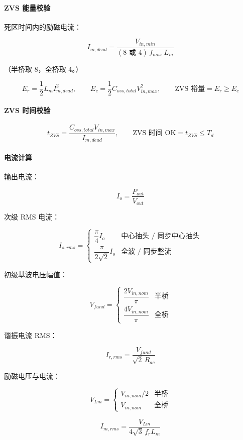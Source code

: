 \documentclass[UTF8]{ctexart}
\begin{document}
\paragraph{ZVS 能量校验}

死区时间内的励磁电流：

\[
I_{m,dead} = \frac{V_{in,min}}{(8\text{ 或 }4)\,f_{max}\,L_m}
\]

（半桥取 8，全桥取 4。）

\[
E_r = \frac{1}{2} L_m I_{m,dead}^{2},\qquad
E_c = \frac{1}{2} C_{oss,total} V_{in,max}^{2},\qquad
\text{ZVS 裕量} = E_r \ge E_c
\]

\paragraph{ZVS 时间校验}

\[
t_{ZVS} = \frac{C_{oss,total} V_{in,max}}{I_{m,dead}},\qquad
\text{ZVS 时间 OK} = t_{ZVS} \le T_d
\]

\paragraph{电流计算}

输出电流：

\[
I_o = \frac{P_{out}}{V_{out}}
\]

次级 RMS 电流：

\[
I_{s,rms} = \begin{cases}
\dfrac{\pi}{4} I_o & \text{中心抽头 / 同步中心抽头} \\[6pt]
\dfrac{\pi}{2\sqrt{2}} I_o & \text{全波 / 同步整流}
\end{cases}
\]

初级基波电压幅值：

\[
V_{fund} = \begin{cases}
\dfrac{2 V_{in,nom}}{\pi} & \text{半桥} \\[6pt]
\dfrac{4 V_{in,nom}}{\pi} & \text{全桥}
\end{cases}
\]

谐振电流 RMS：

\[
I_{r,rms} = \frac{V_{fund}}{\sqrt{2}\,R_{ac}}
\]

励磁电压与电流：

\[
V_{Lm} = \begin{cases}
V_{in,nom}/2 & \text{半桥} \\[4pt]
V_{in,nom} & \text{全桥}
\end{cases}
\]

\[
I_{m,rms} = \frac{V_{Lm}}{4\sqrt{3}\,f_r L_m}
\]
\end{document}
